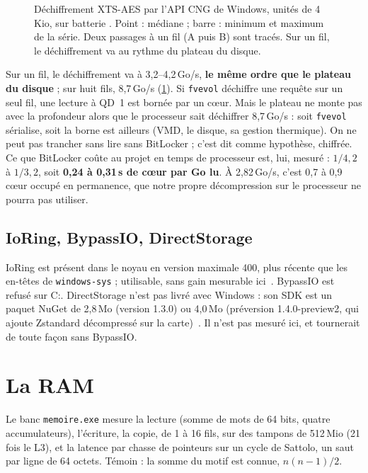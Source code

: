 \begin{figure}[ht]
\centering
\GrapheAES
\caption[Déchiffrement XTS-AES selon le nombre de fils]{Déchiffrement XTS-AES par l'API CNG de Windows, unités de 4\,Kio, sur batterie \mes. Point : médiane ; barre : minimum et maximum de la série. Deux passages à un fil (A puis B) sont tracés. Sur un fil, le déchiffrement va au rythme du plateau du disque.}
\label{fig:aes}
\end{figure}

Sur un fil, le déchiffrement va à 3,2--4,2\,Go/s, \textbf{le même ordre que le plateau du disque} ; sur huit fils, 8,7\,Go/s (\cref{fig:aes}). Si \texttt{fvevol} déchiffre une requête sur un seul fil, une lecture à QD~1 est bornée par un cœur. Mais le plateau ne monte pas avec la profondeur alors que le processeur sait déchiffrer 8,7\,Go/s : soit \texttt{fvevol} sérialise, soit la borne est ailleurs (VMD, le disque, sa gestion thermique). On ne peut pas trancher sans lire sans BitLocker ; c'est dit comme hypothèse, chiffrée. Ce que BitLocker coûte au projet en temps de processeur est, lui, mesuré : $1/4{,}2$ à $1/3{,}2$, soit \textbf{0,24 à 0,31\,s de cœur par Go lu}. À 2,82\,Go/s, c'est 0,7 à 0,9 cœur occupé en permanence, que notre propre décompression sur le processeur ne pourra pas utiliser.

\subsection{IoRing, BypassIO, DirectStorage}
IoRing est présent dans le noyau en version maximale 400, plus récente que les en-têtes de \texttt{windows-sys} ; utilisable, sans gain mesurable ici~\cite{microsoft2026ioring}. BypassIO est refusé sur C:. DirectStorage n'est pas livré avec Windows : son SDK est un paquet NuGet de 2,8\,Mo (version 1.3.0) ou 4,0\,Mo (préversion 1.4.0-preview2, qui ajoute Zstandard décompressé sur la carte)~\cite{nuget2026directstorage,microsoft2026directstorage14}. Il n'est pas mesuré ici, et tournerait de toute façon sans BypassIO.

\section{La RAM}\label{sec:ram}

Le banc \texttt{memoire.exe} mesure la lecture (somme de mots de 64 bits, quatre accumulateurs), l'écriture, la copie, de 1 à 16 fils, sur des tampons de 512\,Mio (21 fois le L3), et la latence par chasse de pointeurs sur un cycle de Sattolo, un saut par ligne de 64 octets. Témoin : la somme du motif est connue, $n(n-1)/2$.

